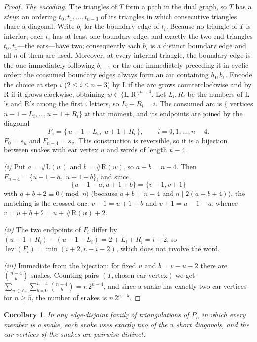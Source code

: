 \documentclass[11pt,a4paper]{article}
\newtheorem{corollary}[theorem]{Corollary}
\theoremstyle{definition}
\theoremstyle{remark}
\newcommand{\Zd}{\ensuremath{\mathbb{Z}}}
\newcommand{\Li}{\mathrm{L}}
\newcommand{\Ri}{\mathrm{R}}
\begin{document}
\begin{proof}
\emph{The encoding.}  The triangles of $T$ form a path in the dual graph, so $T$ has a
\emph{strip}: an ordering $t_0,t_1,\dots,t_{n-3}$ of its triangles in which consecutive
triangles share a diagonal.  Write $b_i$ for the boundary edge of $t_i$.  Because no
triangle of $T$ is interior, each $t_i$ has at least one boundary edge, and exactly the two
end triangles $t_0,t_1$---the ears---have two; consequently each $b_i$ is a distinct
boundary edge and all $n$ of them are used.  Moreover, at every internal triangle, the
boundary edge is the one immediately following $b_{i-1}$ or the one immediately preceding
it in cyclic order: the consumed boundary edges always form an arc containing $b_0,b_1$.
Encode the choice at step $i$ ($2\le i\le n-3$) by $\Li$ if the arc grows counterclockwise
and by $\Ri$ if it grows clockwise, obtaining $w\in\{\Li,\Ri\}^{n-4}$.  Let $L_i,R_i$ be the
numbers of $\Li$'s and $\Ri$'s among the first $i$ letters, so $L_i+R_i=i$.  The consumed
arc is $\{$ vertices $u-1-L_i,\dots,u+1+R_i\}$ at that moment, and its endpoints are joined
by the diagonal
\[ F_i=\{\,u-1-L_i,\;u+1+R_i\,\},\qquad i=0,1,\dots,n-4. \tag{1} \]
$F_0=s_u$ and $F_{n-4}=s_v$.  This construction is reversible, so it is a bijection between
snakes with ear vertex $u$ and words of length $n-4$.

\emph{(i)} Put $a=\#\Li(w)$ and $b=\#\Ri(w)$, so $a+b=n-4$.  Then
$F_{n-4}=\{u-1-a,\;u+1+b\}$, and since
\[
  \{u-1-a,u+1+b\}=\{v-1,v+1\}
\]
with $a+b+2\equiv0 \pmod n$ (because $a+b=n-4$ and $n\mid 2(a+b+4)$), the matching is the
crossed one: $v-1=u+1+b$ and $v+1=u-1-a$, whence $v=u+b+2=u+\#\Ri(w)+2$.

\emph{(ii)} The two endpoints of $F_i$ differ by $(u+1+R_i)-(u-1-L_i)=2+L_i+R_i=i+2$, so
$\operatorname{lev}(F_i)=\min(i+2,n-i-2)$, which does not involve the word.

\emph{(iii)} Immediate from the bijection: for fixed $u$ and $b=v-u-2$ there are
$\binom{n-4}{b}$ snakes.  Counting pairs $(T,\text{chosen ear vertex})$ we get
$\sum_{u\in\Zd_n}\sum_{b=0}^{n-4}\binom{n-4}{b}=n\,2^{n-4}$, and since a snake has exactly two
ear vertices for $n\ge5$, the number of snakes is $n\,2^{n-5}$.
\end{proof}

\begin{corollary}
In any edge-disjoint family of triangulations of $P_n$ in which every member is a snake,
each snake uses exactly two of the $n$ short diagonals, and the ear vertices of the
snakes are pairwise distinct.
\end{corollary}
\end{document}
